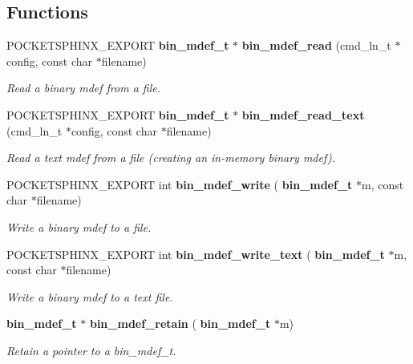 \subsection*{Functions}
\begin{DoxyCompactItemize}
\item 
\mbox{\label{bin__mdef_8h_a3930ae6b3309a615335585db4b46306f}} 
P\+O\+C\+K\+E\+T\+S\+P\+H\+I\+N\+X\+\_\+\+E\+X\+P\+O\+RT \textbf{ bin\+\_\+mdef\+\_\+t} $\ast$ \textbf{ bin\+\_\+mdef\+\_\+read} (cmd\+\_\+ln\+\_\+t $\ast$config, const char $\ast$filename)
\begin{DoxyCompactList}\small\item\em Read a binary mdef from a file. \end{DoxyCompactList}\item 
\mbox{\label{bin__mdef_8h_a00dab94d45d1adc5f7778fd1e2398031}} 
P\+O\+C\+K\+E\+T\+S\+P\+H\+I\+N\+X\+\_\+\+E\+X\+P\+O\+RT \textbf{ bin\+\_\+mdef\+\_\+t} $\ast$ \textbf{ bin\+\_\+mdef\+\_\+read\+\_\+text} (cmd\+\_\+ln\+\_\+t $\ast$config, const char $\ast$filename)
\begin{DoxyCompactList}\small\item\em Read a text mdef from a file (creating an in-\/memory binary mdef). \end{DoxyCompactList}\item 
\mbox{\label{bin__mdef_8h_a982b8e598afed47805fab1509e8fc4bb}} 
P\+O\+C\+K\+E\+T\+S\+P\+H\+I\+N\+X\+\_\+\+E\+X\+P\+O\+RT int \textbf{ bin\+\_\+mdef\+\_\+write} (\textbf{ bin\+\_\+mdef\+\_\+t} $\ast$m, const char $\ast$filename)
\begin{DoxyCompactList}\small\item\em Write a binary mdef to a file. \end{DoxyCompactList}\item 
\mbox{\label{bin__mdef_8h_af89d79226df33947019efcfe7377d586}} 
P\+O\+C\+K\+E\+T\+S\+P\+H\+I\+N\+X\+\_\+\+E\+X\+P\+O\+RT int \textbf{ bin\+\_\+mdef\+\_\+write\+\_\+text} (\textbf{ bin\+\_\+mdef\+\_\+t} $\ast$m, const char $\ast$filename)
\begin{DoxyCompactList}\small\item\em Write a binary mdef to a text file. \end{DoxyCompactList}\item 
\mbox{\label{bin__mdef_8h_a297167f03662a9cbd650743d3f4cf8f8}} 
\textbf{ bin\+\_\+mdef\+\_\+t} $\ast$ \textbf{ bin\+\_\+mdef\+\_\+retain} (\textbf{ bin\+\_\+mdef\+\_\+t} $\ast$m)
\begin{DoxyCompactList}\small\item\em Retain a pointer to a bin\+\_\+mdef\+\_\+t. \end{DoxyCompactList}\item 

\end{DoxyCompactItemize}
